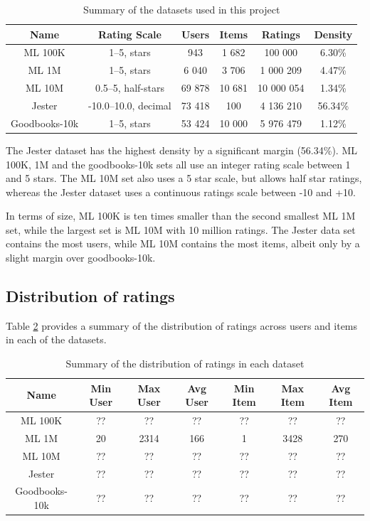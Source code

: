 \begin{table}[H]
\caption[Data summary]{Summary of the datasets used in this project}
\label{tab:data-summary}
\centering
\begin{tabular}{c | c | c | c | c | c}
\toprule
\textbf{Name} & \textbf{Rating Scale} & \textbf{Users} & \textbf{Items} & \textbf{Ratings} & \textbf{Density} \\
\midrule
ML 100K & 1--5, stars & 943 & 1 682 & 100 000 & 6.30\% \\
ML 1M & 1--5, stars & 6 040 & 3 706 & 1 000 209 & 4.47\% \\
ML 10M & 0.5--5, half-stars & 69 878 & 10 681 & 10 000 054 & 1.34\% \\
Jester & -10.0--10.0, decimal & 73 418 & 100 & 4 136 210 & 56.34\% \\
Goodbooks-10k & 1--5, stars & 53 424 & 10 000 & 5 976 479 & 1.12\% \\
\bottomrule
\end{tabular}
\end{table}

The Jester dataset has the highest density by a significant margin (56.34\%). ML 100K, 1M and the goodbooks-10k sets all use an integer rating scale between 1 and 5 stars. The ML 10M set also uses a 5 star scale, but allows half star ratings, whereas the Jester dataset uses a continuous ratings scale between -10 and +10.

In terms of size, ML 100K is ten times smaller than the second smallest ML 1M set, while the largest set is ML 10M with 10 million ratings. The Jester data set contains the most users, while ML 10M contains the most items, albeit only by a slight margin over goodbooks-10k.

\subsection{Distribution of ratings}
Table \ref{tab:ratings-distribution} provides a summary of the distribution of ratings across users and items in each of the datasets. 

\begin{table}[H]
\caption[Ratings distribution]{Summary of the distribution of ratings in each dataset}
\label{tab:ratings-distribution}
\centering
\begin{tabular}{c | c | c | c | c | c | c}
\toprule
\textbf{Name} & \textbf{Min User} & \textbf{Max User} & \textbf{Avg User} & \textbf{Min Item} & \textbf{Max Item} & \textbf{Avg Item} \\
\midrule
ML 100K & ?? & ?? & ?? & ?? & ?? & ?? \\
ML 1M & 20 & 2314 & 166 & 1 & 3428 & 270 \\
ML 10M & ?? & ?? & ?? & ?? & ?? & ?? \\
Jester & ?? & ?? & ?? & ?? & ?? & ?? \\
Goodbooks-10k & ?? & ?? & ?? & ?? & ?? & ?? \\
\bottomrule
\end{tabular}
\end{table}

